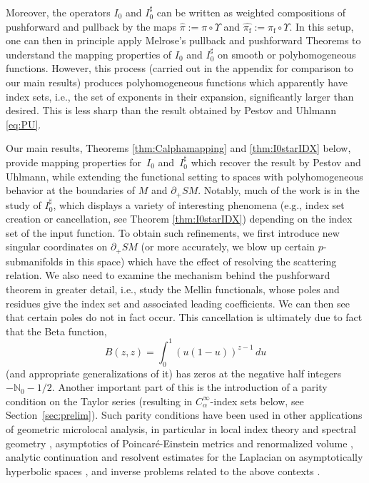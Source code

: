 \documentclass[11pt]{article}
\newcommand{\ie}{i.e.,\xspace}
\newcommand{\eg}{e.g.,\xspace}
\theoremstyle{plain}
\theoremstyle{definition}
\theoremstyle{remark}
\def\Nm{{\mathbb{N}}}
\newcommand{\adj}{I_0^\sharp}
\newcommand{\hpi}{\widehat{\pi}}
\newcommand{\foot}{{\pi_{\mathrm f}}}
\newcommand{\hF}{\widehat{\foot}}
\begin{document}
Moreover, the operators $I_0$ and $\adj$ can be written as weighted compositions of pushforward and pullback by the maps $\hpi:= \pi\circ\Upsilon$ and $\hF:= \foot\circ\Upsilon$. In this setup, one can then in principle apply Melrose's pullback and pushforward Theorems to understand the mapping properties of $I_0$ and $\adj$ on smooth or polyhomogeneous functions. However, this process (carried out in the appendix for comparison to our main results) produces polyhomogeneous functions which apparently have index sets, \ie the set of exponents in their expansion, significantly larger than desired. This is less sharp than the result obtained by Pestov and Uhlmann \eqref{eq:PU}.

Our main results, Theorems \ref{thm:Calphamapping} and \ref{thm:I0starIDX} below, provide mapping properties for~$I_0$ and~$\adj$ which recover the result by Pestov and Uhlmann, while extending the functional setting to spaces with polyhomogeneous behavior at the boundaries of $M$ and $\partial_+ SM$. Notably, much of the work is in the study of $\adj$, which displays a variety of interesting phenomena (\eg index set creation or cancellation, see Theorem \ref{thm:I0starIDX}) depending on the index set of the input function. To obtain such refinements, we first introduce new singular coordinates on $\partial_+ SM$ (or more accurately, we blow up certain $p$-submanifolds in this space) which have the effect of resolving the scattering relation. We also need to examine the mechanism behind the pushforward theorem in greater detail, \ie study the Mellin functionals, whose poles and residues give the index set and associated leading coefficients. We can then see that certain poles do not in fact occur.
This cancellation is ultimately due to fact that the Beta function,
\begin{equation}
B(z,z) = \int_0^1 (u(1-u))^{z-1}\, du
\label{eq:Beta}
\end{equation}
(and appropriate generalizations of it) has zeros at the negative half integers $-\Nm_0-1/2$. Another important part of this is the introduction of a parity condition on the Taylor series (resulting in $C_\alpha^\infty$-index sets below, see Section~\ref{sec:prelim}). Such parity conditions have been used in other applications of geometric microlocal analysis, in particular in local index theory and spectral geometry \cite{Melrose1993,Mazzeo2014}, asymptotics of Poincaré-Einstein metrics \cite{Fefferman1985} and renormalized volume \cite{Albin2009,Bahuaud2019}, analytic continuation and resolvent estimates for the Laplacian on asymptotically hyperbolic spaces \cite{Vasy2013,Vasy2017}, and inverse problems related to the above contexts \cite{MarxKuo2024,Eptaminitakis2021}.
\end{document}
